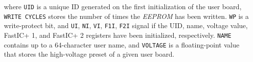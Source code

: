 where \verb|UID| is a unique ID generated on the first initialization of the user board, \verb|WRITE CYCLES| stores the number of times the \emph{EEPROM} has been written. \verb|WP| is a write-protect bit, and \verb|UI|, \verb|NI|, \verb|VI|, \verb|F1I|, \verb|F2I| signal if the UID, name, voltage value, FastIC+ 1, and FastIC+ 2 registers have been initialized, respectively. \verb|NAME| contains up to a 64-character user name, and \verb|VOLTAGE| is a floating-point value that stores the high-voltage preset of a given user board.


